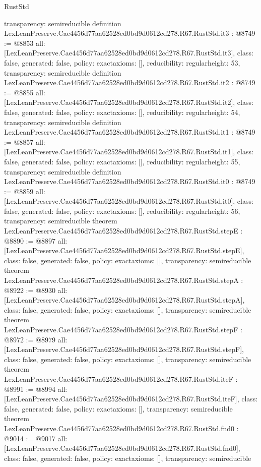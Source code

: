 \begin{lexlean}{RustStd}
\begin{coremodule}
{  transparency: semireducible
}
definition LexLeanPreserve.Cae4456d77aa62528ed0bd9d0612cd278.R67.RustStd.it3 : @8749 := @8853 {
  all: [LexLeanPreserve.Cae4456d77aa62528ed0bd9d0612cd278.R67.RustStd.it3],
  class: false,
  generated: false,
  policy: exact{axioms: []},
  reducibility: regular{height: 53},
  transparency: semireducible
}
definition LexLeanPreserve.Cae4456d77aa62528ed0bd9d0612cd278.R67.RustStd.it2 : @8749 := @8855 {
  all: [LexLeanPreserve.Cae4456d77aa62528ed0bd9d0612cd278.R67.RustStd.it2],
  class: false,
  generated: false,
  policy: exact{axioms: []},
  reducibility: regular{height: 54},
  transparency: semireducible
}
definition LexLeanPreserve.Cae4456d77aa62528ed0bd9d0612cd278.R67.RustStd.it1 : @8749 := @8857 {
  all: [LexLeanPreserve.Cae4456d77aa62528ed0bd9d0612cd278.R67.RustStd.it1],
  class: false,
  generated: false,
  policy: exact{axioms: []},
  reducibility: regular{height: 55},
  transparency: semireducible
}
definition LexLeanPreserve.Cae4456d77aa62528ed0bd9d0612cd278.R67.RustStd.it0 : @8749 := @8859 {
  all: [LexLeanPreserve.Cae4456d77aa62528ed0bd9d0612cd278.R67.RustStd.it0],
  class: false,
  generated: false,
  policy: exact{axioms: []},
  reducibility: regular{height: 56},
  transparency: semireducible
}
theorem LexLeanPreserve.Cae4456d77aa62528ed0bd9d0612cd278.R67.RustStd.stepE : @8890 := @8897 {
  all: [LexLeanPreserve.Cae4456d77aa62528ed0bd9d0612cd278.R67.RustStd.stepE],
  class: false,
  generated: false,
  policy: exact{axioms: []},
  transparency: semireducible
}
theorem LexLeanPreserve.Cae4456d77aa62528ed0bd9d0612cd278.R67.RustStd.stepA : @8922 := @8930 {
  all: [LexLeanPreserve.Cae4456d77aa62528ed0bd9d0612cd278.R67.RustStd.stepA],
  class: false,
  generated: false,
  policy: exact{axioms: []},
  transparency: semireducible
}
theorem LexLeanPreserve.Cae4456d77aa62528ed0bd9d0612cd278.R67.RustStd.stepF : @8972 := @8979 {
  all: [LexLeanPreserve.Cae4456d77aa62528ed0bd9d0612cd278.R67.RustStd.stepF],
  class: false,
  generated: false,
  policy: exact{axioms: []},
  transparency: semireducible
}
theorem LexLeanPreserve.Cae4456d77aa62528ed0bd9d0612cd278.R67.RustStd.iteF : @8991 := @8994 {
  all: [LexLeanPreserve.Cae4456d77aa62528ed0bd9d0612cd278.R67.RustStd.iteF],
  class: false,
  generated: false,
  policy: exact{axioms: []},
  transparency: semireducible
}
theorem LexLeanPreserve.Cae4456d77aa62528ed0bd9d0612cd278.R67.RustStd.fnd0 : @9014 := @9017 {
  all: [LexLeanPreserve.Cae4456d77aa62528ed0bd9d0612cd278.R67.RustStd.fnd0],
  class: false,
  generated: false,
  policy: exact{axioms: []},
  transparency: semireducible
}
\end{coremodule}
\end{lexlean}
